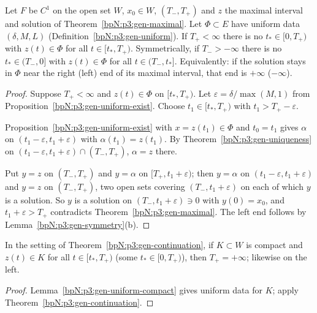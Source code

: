\begin{theorem}\label{bpN:p3:gen-continuation}
Let $F$ be $C^1$ on the open set $W$, $x_0\in W$, $(T_-,T_+)$ and $z$ the maximal interval and solution of
Theorem~\ref{bpN:p3:gen-maximal}. Let $\Phi\subset E$ have uniform data $(\delta,M,L)$
(Definition~\ref{bpN:p3:gen-uniform}). If $T_+<\infty$ there is no $t_*\in[0,T_+)$ with $z(t)\in\Phi$ for all
$t\in[t_*,T_+)$. Symmetrically, if $T_->-\infty$ there is no $t_*\in(T_-,0]$ with $z(t)\in\Phi$ for all $t\in(T_-,t_*]$.
Equivalently: if the solution stays in $\Phi$ near the right (left) end of its maximal interval, that end is $+\infty$ ($-\infty$).
\end{theorem}
\begin{proof}
\label{stepN:p3:cont-setup} Suppose $T_+<\infty$ and $z(t)\in\Phi$ on $[t_*,T_+)$. Let $\varepsilon=\delta/\max(M,1)$ from Proposition~\ref{bpN:p3:gen-uniform-exist}. Choose $t_1\in[t_*,T_+)$ with $t_1>T_+-\varepsilon$.

\label{stepN:p3:cont-alpha} Proposition~\ref{bpN:p3:gen-uniform-exist} with $x=z(t_1)\in\Phi$ and $t_0=t_1$ gives $\alpha$ on $(t_1-\varepsilon,t_1+\varepsilon)$ with $\alpha(t_1)=z(t_1)$.
By Theorem~\ref{bpN:p3:gen-uniqueness} on $(t_1-\varepsilon,t_1+\varepsilon)\cap(T_-,T_+)$, $\alpha=z$ there.

\label{stepN:p3:cont-glue} Put $y=z$ on $(T_-,T_+)$ and $y=\alpha$ on $[T_+,t_1+\varepsilon)$; then $y=\alpha$ on $(t_1-\varepsilon,t_1+\varepsilon)$ and $y=z$ on $(T_-,T_+)$, two open sets covering $(T_-,t_1+\varepsilon)$ on each of which $y$ is a solution.
So $y$ is a solution on $(T_-,t_1+\varepsilon)\ni0$ with $y(0)=x_0$, and $t_1+\varepsilon>T_+$ contradicts Theorem~\ref{bpN:p3:gen-maximal}.
The left end follows by Lemma~\ref{bpN:p3:gen-symmetry}(b).
\end{proof}

\begin{corollary}\label{bpN:p3:gen-continuation-compact}
In the setting of Theorem~\ref{bpN:p3:gen-continuation}, if $K\subset W$ is compact and $z(t)\in K$ for all
$t\in[t_*,T_+)$ (some $t_*\in[0,T_+)$), then $T_+=+\infty$; likewise on the left.
\end{corollary}
\begin{proof}
Lemma~\ref{bpN:p3:gen-uniform-compact} gives uniform data for $K$; apply Theorem~\ref{bpN:p3:gen-continuation}.
\end{proof}

